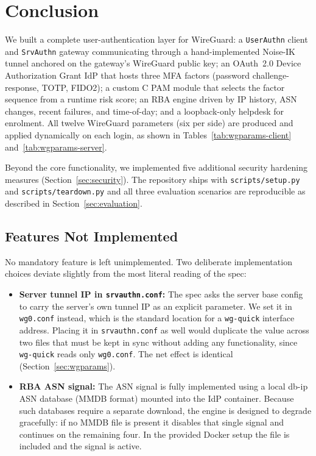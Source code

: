 \section{Conclusion}
\label{sec:conclusion}

We built a complete user-authentication layer for WireGuard:
a \texttt{UserAuthn} client and \texttt{SrvAuthn} gateway communicating
through a hand-implemented Noise-IK tunnel anchored on the gateway's
WireGuard public key; an OAuth~2.0 Device Authorization Grant IdP that
hosts three MFA factors (password challenge-response, TOTP, FIDO2);
a custom C PAM module that selects the factor sequence from a runtime
risk score; an RBA engine driven by IP history, ASN changes, recent
failures, and time-of-day; and a loopback-only helpdesk for enrolment.
All twelve WireGuard parameters (six per side) are produced and applied
dynamically on each login, as shown in Tables~\ref{tab:wgparams-client} and~\ref{tab:wgparams-server}.

Beyond the core functionality, we implemented five additional security
hardening measures (Section~\ref{sec:security}).
The repository ships with \texttt{scripts/setup.py} and
\texttt{scripts/teardown.py} and all three evaluation scenarios are
reproducible as described in Section~\ref{sec:evaluation}.

\subsection{Features Not Implemented}
No mandatory feature is left unimplemented.
Two deliberate implementation choices deviate slightly from the most
literal reading of the spec:

\begin{itemize}
  \item \textbf{Server tunnel IP in \texttt{srvauthn.conf}:}
    The spec asks the server base config to carry the server's own tunnel
    IP as an explicit parameter.
    We set it in \texttt{wg0.conf} instead, which is the standard location
    for a \texttt{wg-quick} interface address.
    Placing it in \texttt{srvauthn.conf} as well would duplicate the value
    across two files that must be kept in sync without adding any
    functionality, since \texttt{wg-quick} reads only \texttt{wg0.conf}.
    The net effect is identical (Section~\ref{sec:wgparams}).
  \item \textbf{RBA ASN signal:}
    The ASN signal is fully implemented using a local db-ip ASN database
    (MMDB format) mounted into the IdP container.
    Because such databases require a separate download, the engine is
    designed to degrade gracefully: if no MMDB file is present it disables
    that single signal and continues on the remaining four.
    In the provided Docker setup the file is included and the signal is
    active.
\end{itemize}

